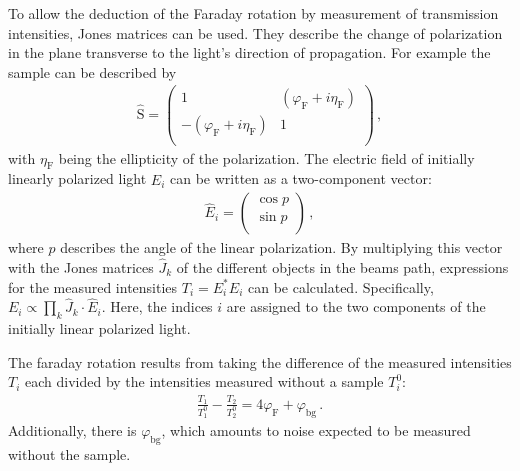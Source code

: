 	To allow the deduction of the Faraday rotation by measurement of transmission intensities, Jones matrices can be used.
	They describe the change of polarization in the plane transverse to the light's direction of propagation.
	For example the sample can be described by
	\begin{align*}
		\hat{\text{S}} = \left( \begin{array}{rr}
		1 & (\varphi_\text{F} + i\eta_\text{F}) \\
		-(\varphi_\text{F} + i\eta_\text{F}) & 1 \\
	\end{array}\right) \,,
	\end{align*}
  with $\eta_\text{F}$ being the ellipticity of the polarization.
	The electric field of initially linearly polarized light $\hat{E}_i$ can be written as a two-component vector:
	\begin{align*}
		\hat{E}_i = \left( \begin{array}{r}
					\cos{p} \\
					\sin{p} \\
				\end{array}\right) \,,
	\end{align*}
	where $p$ describes the angle of the linear polarization.
	By multiplying this vector with the Jones matrices $\hat{J}_k$ of the different objects in the beams path, expressions for the measured intensities $T_i = E_i^* E_i$ can be calculated.
  Specifically, $E_i \propto \prod_k \hat{J}_k \cdot \hat{E}_i$.
  Here, the indices $i$ are assigned to the two components of the initially linear polarized light.

  The faraday rotation results from taking the difference of the measured intensities $T_i$ each divided by the intensities measured without a sample $T_i^0$:
	\begin{align*}
		\frac{T_1}{T_1^0} - \frac{T_2}{T_2^0} = 4 \varphi_\text{F} + \varphi_\text{bg} \,.
	\end{align*}
	Additionally, there is $\varphi_\text{bg}$, which amounts to noise expected to be measured without the sample.
